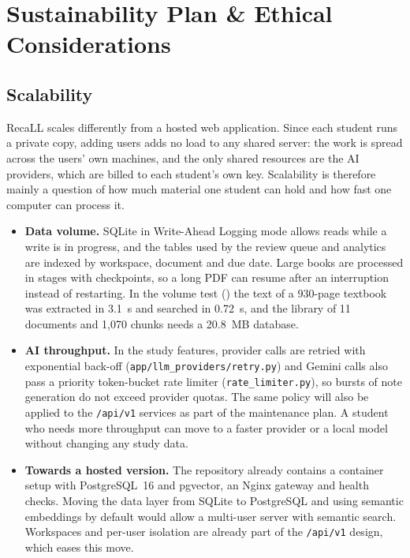 \chapter{Sustainability Plan \& Ethical Considerations}\label{ch:sustain}

\section{Scalability}

RecaLL scales differently from a hosted web application. Since each student runs a private copy,
adding users adds no load to any shared server: the work is spread across the users' own machines,
and the only shared resources are the AI providers, which are billed to each student's own key.
Scalability is therefore mainly a question of how much material one student can hold and how fast
one computer can process it.

\begin{itemize}
  \item \textbf{Data volume.} SQLite in Write-Ahead Logging mode allows reads while a write is in
  progress, and the tables used by the review queue and analytics are indexed by workspace, document
  and due date. Large books are processed in stages with checkpoints, so a long PDF can resume after
  an interruption instead of restarting. In the volume test () the text of a 930-page textbook
  was extracted in 3.1~s and searched in 0.72~s, and the library of 11 documents and 1{,}070 chunks needs a
  20.8~MB database.
  \item \textbf{AI throughput.} In the study features, provider calls are retried with exponential
  back-off (\texttt{app/llm\_providers/retry.py}) and Gemini calls also pass a priority token-bucket rate
  limiter (\texttt{rate\_limiter.py}), so bursts of note generation do not exceed provider quotas. The
  same policy will also be applied to the \texttt{/api/v1} services as part of the maintenance plan. A student who needs more throughput can move to a faster provider or a local model without
  changing any study data.
  \item \textbf{Towards a hosted version.} The repository already contains a container setup with
  PostgreSQL~16 and pgvector, an Nginx gateway and health checks. Moving the data layer from SQLite to
  PostgreSQL and using semantic embeddings by default would allow a
  multi-user server with semantic search. Workspaces and per-user isolation are already part of the
  \texttt{/api/v1} design, which eases this move.
\end{itemize}

